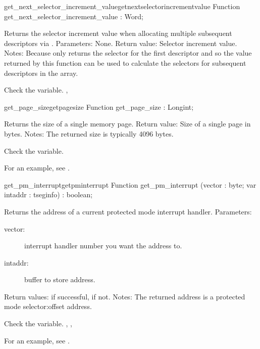 \begin{functionl}{get\_next\_selector\_increment\_value}{getnextselectorincrementvalue}
\Declaration
Function get\_next\_selector\_increment\_value  : Word;

\Description
Returns the selector increment value when allocating multiple subsequent
descriptors via .
Parameters: None.
Return value: Selector increment value.
Notes: Because  only returns the selector for the
first descriptor and so the value returned by this function can be used to
calculate the selectors for subsequent descriptors in the array.

\Errors
 Check the  variable.
\SeeAlso
 , 
\end{functionl}
\begin{functionl}{get\_page\_size}{getpagesize}
\Declaration
Function get\_page\_size  :  Longint;

\Description
 Returns the size of a single memory page.
Return value: Size of a single page in bytes.
Notes: The returned size is typically 4096 bytes.

\Errors
 Check the  variable.
\SeeAlso
\end{functionl}
For an example, see .
\begin{functionl}{get\_pm\_interrupt}{getpminterrupt}
\Declaration
Function get\_pm\_interrupt (vector : byte; var intaddr : tseginfo) : boolean;

\Description
Returns the address of a current protected mode interrupt handler.
Parameters:
\begin{description}
\item[vector:\ ] interrupt handler number you want the address to.
\item[intaddr:\ ] buffer to store address.
\end{description}
Return values:  if successful,  if not.
Notes: The returned address is a protected mode selector:offset address.

\Errors
 Check the  variable.
\SeeAlso
 ,
,  
\end{functionl}
For an example, see .
